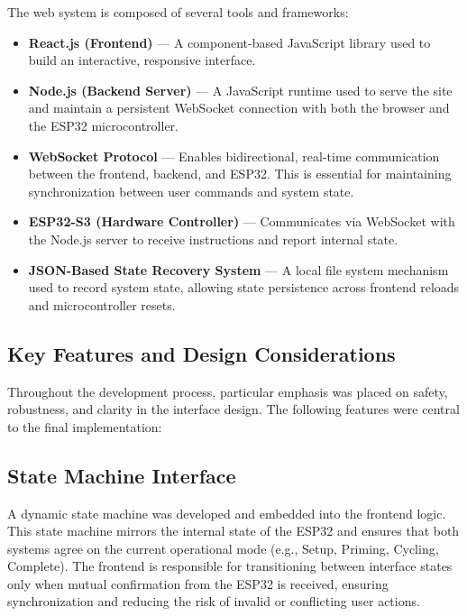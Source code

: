 \documentclass[12pt]{article}
\begin{document}
            The web system is composed of several tools and frameworks:
            
            \begin{itemize}
                \item \textbf{React.js (Frontend)} — A component-based JavaScript library used to build an interactive, responsive interface.
                \item \textbf{Node.js (Backend Server)} — A JavaScript runtime used to serve the site and maintain a persistent WebSocket connection with both the browser and the ESP32 microcontroller.
                \item \textbf{WebSocket Protocol} — Enables bidirectional, real-time communication between the frontend, backend, and ESP32. This is essential for maintaining synchronization between user commands and system state.
                \item \textbf{ESP32-S3 (Hardware Controller)} — Communicates via WebSocket with the Node.js server to receive instructions and report internal state.
                \item \textbf{JSON-Based State Recovery System} — A local file system mechanism used to record system state, allowing state persistence across frontend reloads and microcontroller resets.
            \end{itemize}
            
            \subsection{Key Features and Design Considerations}
            
            Throughout the development process, particular emphasis was placed on safety, robustness, and clarity in the interface design. The following features were central to the final implementation:
            
            \subsection{State Machine Interface}
            
            A dynamic state machine was developed and embedded into the frontend logic. This state machine mirrors the internal state of the ESP32 and ensures that both systems agree on the current operational mode (e.g., Setup, Priming, Cycling, Complete). The frontend is responsible for transitioning between interface states only when mutual confirmation from the ESP32 is received, ensuring synchronization and reducing the risk of invalid or conflicting user actions.
            
\end{document}
